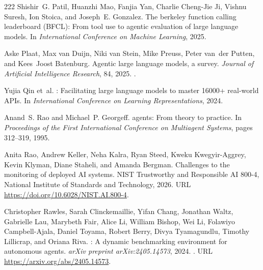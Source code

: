 \begin{thebibliography}{222}
Shishir~G. Patil, Huanzhi Mao, Fanjia Yan, Charlie Cheng-Jie Ji, Vishnu Suresh,
  Ion Stoica, and Joseph~E. Gonzalez.
\newblock The berkeley function calling leaderboard ({BFCL}): From tool use to
  agentic evaluation of large language models.
\newblock In \emph{International Conference on Machine Learning}, 2025.

Aske Plaat, Max van Duijn, Niki van Stein, Mike Preuss, Peter van~der Putten,
  and Kees~Joost Batenburg.
\newblock Agentic large language models, a survey.
\newblock \emph{Journal of Artificial Intelligence Research}, 84, 2025.
\newblock {}.

Yujia Qin et~al.
: Facilitating large language models to master 16000+
  real-world {APIs}.
\newblock In \emph{International Conference on Learning Representations}, 2024.

Anand~S. Rao and Michael~P. Georgeff.
 agents: From theory to practice.
\newblock In \emph{Proceedings of the First International Conference on
  Multiagent Systems}, pages 312--319, 1995.

Anita Rao, Andrew Keller, Neha Kalra, Ryan Steed, Kweku Kwegyir-Aggrey, Kevin
  Klyman, Diane Staheli, and Amanda Bergman.
\newblock Challenges to the monitoring of deployed {AI} systems.
\newblock NIST Trustworthy and Responsible AI 800-4, National Institute of
  Standards and Technology, 2026.
\newblock URL \url{https://doi.org/10.6028/NIST.AI.800-4}.

Christopher Rawles, Sarah Clinckemaillie, Yifan Chang, Jonathan Waltz,
  Gabrielle Lau, Marybeth Fair, Alice Li, William Bishop, Wei Li, Folawiyo
  Campbell-Ajala, Daniel Toyama, Robert Berry, Divya Tyamagundlu, Timothy
  Lillicrap, and Oriana Riva.
: A dynamic benchmarking environment for autonomous
  agents.
\newblock \emph{arXiv preprint arXiv:2405.14573}, 2024.
\newblock {}.
\newblock URL \url{https://arxiv.org/abs/2405.14573}.


\end{thebibliography}
